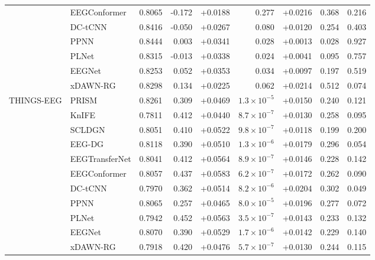 \begin{table}[H]
\begin{adjustbox}{max width=\textwidth}
\begin{tabular}{@{}llrrrrrrr@{}}
 & EEGConformer & 0.8065 & -0.172 & +0.0188 & 0.277 & +0.0216 & 0.368 & 0.216 \\
 & DC-tCNN & 0.8416 & -0.050 & +0.0267 & 0.080 & +0.0120 & 0.254 & 0.403 \\
 & PPNN & 0.8444 & 0.003 & +0.0341 & 0.028 & +0.0013 & 0.028 & 0.927 \\
 & PLNet & 0.8315 & -0.013 & +0.0338 & 0.024 & +0.0041 & 0.095 & 0.757 \\
 & EEGNet & 0.8253 & 0.052 & +0.0353 & 0.034 & +0.0097 & 0.197 & 0.519 \\
 & xDAWN-RG & 0.8298 & 0.134 & +0.0225 & 0.062 & +0.0214 & 0.512 & 0.074 \\
\midrule
\multirow{11}{*}{THINGS-EEG} & PRISM & 0.8261 & 0.309 & +0.0469 & $1.3\times10^{-5}$ & +0.0150 & 0.240 & 0.121 \\
 & KnIFE & 0.7811 & 0.412 & +0.0440 & $8.7\times10^{-7}$ & +0.0130 & 0.258 & 0.095 \\
 & SCLDGN & 0.8051 & 0.410 & +0.0522 & $9.8\times10^{-7}$ & +0.0118 & 0.199 & 0.200 \\
 & EEG-DG & 0.8118 & 0.390 & +0.0510 & $1.3\times10^{-6}$ & +0.0179 & 0.296 & 0.054 \\
 & EEGTransferNet & 0.8041 & 0.412 & +0.0564 & $8.9\times10^{-7}$ & +0.0146 & 0.228 & 0.142 \\
 & EEGConformer & 0.8057 & 0.437 & +0.0583 & $6.2\times10^{-7}$ & +0.0172 & 0.262 & 0.090 \\
 & DC-tCNN & 0.7970 & 0.362 & +0.0514 & $8.2\times10^{-6}$ & +0.0204 & 0.302 & 0.049 \\
 & PPNN & 0.8065 & 0.257 & +0.0465 & $8.0\times10^{-5}$ & +0.0196 & 0.277 & 0.072 \\
 & PLNet & 0.7942 & 0.452 & +0.0563 & $3.5\times10^{-7}$ & +0.0143 & 0.233 & 0.132 \\
 & EEGNet & 0.8070 & 0.390 & +0.0529 & $1.7\times10^{-6}$ & +0.0142 & 0.229 & 0.140 \\
 & xDAWN-RG & 0.7918 & 0.420 & +0.0476 & $5.7\times10^{-7}$ & +0.0130 & 0.244 & 0.115 \\
\bottomrule
\end{tabular}
\end{adjustbox}
\end{table}
